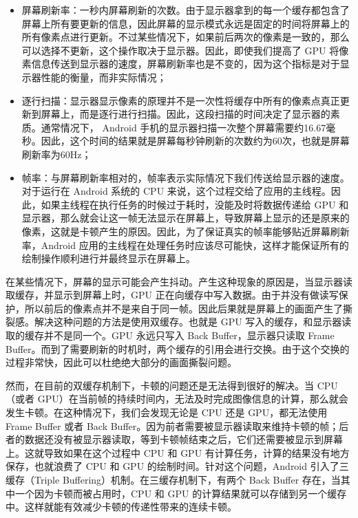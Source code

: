\begin{itemize}
    \item 屏幕刷新率：一秒内屏幕刷新的次数。由于显示器拿到的每一个缓存都包含了屏幕上所有要更新的信息，因此屏幕的显示模式永远是固定的时间将屏幕上的所有像素点进行更新。不过某些情况下，如果前后两次的像素是一致的，那么可以选择不更新，这个操作取决于显示器。因此，即使我们提高了 GPU 将像素信息传送到显示器的速度，屏幕刷新率也是不变的，因为这个指标是对于显示器性能的衡量，而非实际情况；
    \item 逐行扫描：显示器显示像素的原理并不是一次性将缓存中所有的像素点真正更新到屏幕上，而是逐行进行扫描\cite{张春明2002显示器刷新率的测试以及逐行显示器的辨别方法}。因此，这段扫描的时间决定了显示器的素质。通常情况下， Android 手机的显示器扫描一次整个屏幕需要约16.67毫秒。因此，这个时间的结果就是屏幕每秒钟刷新的次数约为60次，也就是屏幕刷新率为60Hz；
    \item 帧率：与屏幕刷新率相对的，帧率表示实际情况下我们传送给显示器的速度。对于运行在 Android 系统的 CPU 来说，这个过程交给了应用的主线程。因此，如果主线程在执行任务的时候过于耗时，没能及时将数据传递给 GPU 和显示器，那么就会让这一帧无法显示在屏幕上，导致屏幕上显示的还是原来的像素，这就是卡顿产生的原因。因此，为了保证真实的帧率能够贴近屏幕刷新率，Android 应用的主线程在处理任务时应该尽可能快，这样才能保证所有的绘制操作顺利进行并最终显示在屏幕上。
\end{itemize}

在某些情况下，屏幕的显示可能会产生抖动。产生这种现象的原因是，当显示器读取缓存，并显示到屏幕上时，GPU 正在向缓存中写入数据。由于并没有做读写保护，所以前后的像素点并不是来自于同一帧。因此后果就是屏幕上的画面产生了撕裂感\cite{yun2017reducing}。解决这种问题的方法是使用双缓存。也就是 GPU 写入的缓存，和显示器读取的缓存并不是同一个。GPU 永远只写入 Back Buffer，显示器只读取 Frame Buffer。而到了需要刷新的时机时，两个缓存的引用会进行交换。由于这个交换的过程非常快，因此可以杜绝绝大部分的画面撕裂问题。

然而，在目前的双缓存机制下，卡顿的问题还是无法得到很好的解决。当 CPU（或者 GPU）在当前帧的持续时间内，无法及时完成图像信息的计算，那么就会发生卡顿。在这种情况下，我们会发现无论是 CPU 还是 GPU，都无法使用 Frame Buffer 或者 Back Buffer。因为前者需要被显示器读取来维持卡顿的帧；后者的数据还没有被显示器读取，等到卡顿帧结束之后，它们还需要被显示到屏幕上。这就导致如果在这个过程中 CPU 和 GPU 有计算任务，计算的结果没有地方保存，也就浪费了 CPU 和 GPU 的绘制时间。针对这个问题，Android 引入了三缓存（Triple Buffering）机制\cite{egilmez2017user}。在三缓存机制下，有两个 Back Buffer 存在，当其中一个因为卡顿而被占用时，CPU 和 GPU 的计算结果就可以存储到另一个缓存中。这样就能有效减少卡顿的传递性带来的连续卡顿。

